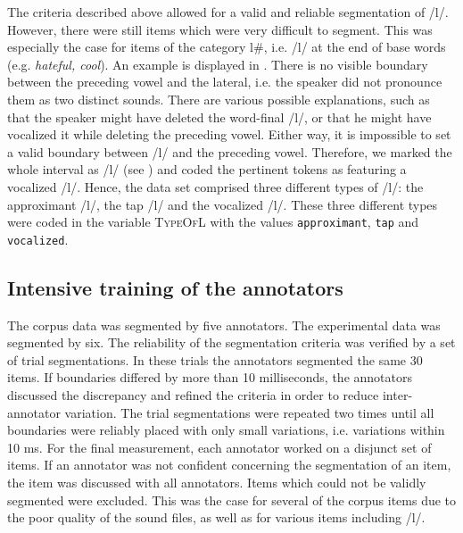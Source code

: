 
The criteria described above allowed for a valid and reliable segmentation of /l/. However, there were still items which were very difficult to segment. This was especially the case for items of the category l\#, i.e. /l/ at the end of base words (e.g. \textit{hateful, cool}). An example is displayed in . There is no visible boundary between the preceding vowel and the lateral, i.e. the speaker did not pronounce them as two distinct sounds. There are various possible explanations, such as that the speaker might have deleted the word-final /l/, or that he might have vocalized it  while deleting the preceding vowel. Either way,  it is impossible to set a valid boundary between /l/ and the preceding vowel. Therefore, we marked the whole interval as /l/ (see ) and coded the pertinent tokens as featuring a vocalized /l/. Hence, the data set comprised three different types of /l/: the approximant /l/, the tap /l/ and the vocalized /l/. These three different types were coded in the variable \textsc{TypeOfL} with the values \texttt{approximant}, \texttt{tap} and \texttt{vocalized}.



\subsection{Intensive training of the annotators}

The corpus data was segmented by five annotators. The experimental data was segmented by six. The reliability of the segmentation criteria was verified by a set of trial segmentations.  In these trials the annotators segmented the same 30 items. If boundaries differed by more than 10 milliseconds, the annotators discussed the discrepancy and refined the criteria in order to reduce inter-annotator variation. The trial segmentations were repeated two times until all boundaries were reliably placed with only small variations, i.e. variations within 10 ms. For the final measurement, each annotator worked on a disjunct set of items. If an annotator was not confident concerning the segmentation of an item, the item was discussed with all annotators. Items which could not be validly segmented were excluded. This was the case for several of the corpus items due to the poor quality of the sound files, as well as for various items including /l/. \\%

